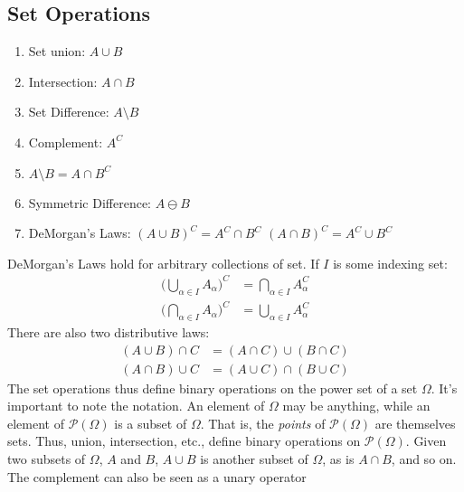 \documentclass[crop=false,class=book,oneside]{standalone}
\begin{document}
        \subsection{Set Operations}
            \begin{enumerate}
                \item Set union: $A\cup{B}$
                \item Intersection: $A\cap{B}$
                \item Set Difference: $A\setminus{B}$
                \item Complement: $A^{C}$
                \item $A\setminus{B}=A\cap{B}^{C}$
                \item Symmetric Difference: $A\ominus{B}$
                \item DeMorgan's Laws:
                      \subitem $(A\cup{B})^{C}=A^{C}\cap{B}^{C}$
                      \subitem $(A\cap{B})^{C}=A^{C}\cup{B}^{C}$
            \end{enumerate}
            DeMorgan's Laws hold for arbitrary collections
            of set. If $I$ is some indexing set:
            \begin{align}
                \Big(\bigcup_{\alpha\in{I}}A_{\alpha}\Big)^{C}
                &=\bigcap_{\alpha\in{I}}A_{\alpha}^{C}\\
                \Big(\bigcap_{\alpha\in{I}}A_{\alpha}\Big)^{C}
                &=\bigcup_{\alpha\in{I}}A_{\alpha}^{C}
            \end{align}
            There are also two distributive laws:
            \begin{align}
                (A\cup{B})\cap{C}&=(A\cap{C})\cup(B\cap{C})\\
                (A\cap{B})\cup{C}&=(A\cup{C})\cap(B\cup{C})
            \end{align}
            The set operations thus define binary operations
            on the power set of a set $\Omega$. It's important
            to note the notation. An element of $\Omega$ may
            be anything, while an element of
            $\mathcal{P}(\Omega)$ is a subset of $\Omega$.
            That is, the \textit{points} of $\mathcal{P}(\Omega)$
            are themselves sets. Thus, union, intersection,
            etc., define binary operations on
            $\mathcal{P}(\Omega)$. Given two subsets of
            $\Omega$, $A$ and $B$, $A\cup{B}$ is another
            subset of $\Omega$, as is $A\cap{B}$, and so on.
            The complement can also be seen as a unary operator
\end{document}
